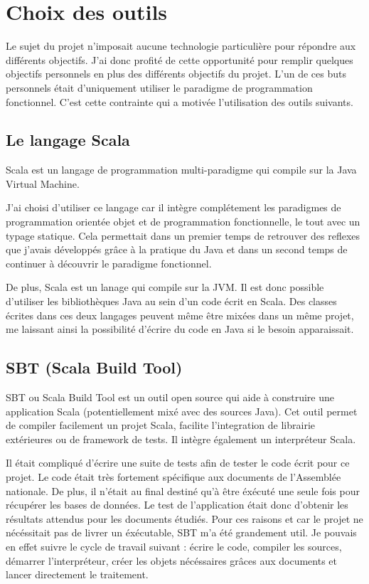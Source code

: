 \section{Choix des outils}

Le sujet du projet n'imposait aucune technologie particulière pour répondre aux différents objectifs. J'ai donc profité de cette opportunité pour remplir quelques objectifs personnels en plus des différents objectifs du projet. L'un de ces buts personnels était d'uniquement utiliser le paradigme de programmation fonctionnel. C'est cette contrainte qui a motivée l'utilisation des outils suivants.

\subsection{Le langage Scala}

Scala est un langage de programmation multi-paradigme qui compile sur la Java Virtual Machine.

J'ai choisi d'utiliser ce langage car il intègre complétement les paradigmes de programmation orientée objet et de programmation fonctionnelle, le tout avec un typage statique. Cela permettait dans un premier temps de retrouver des reflexes que j'avais développés grâce à la pratique du Java et dans un second temps de continuer à découvrir le paradigme fonctionnel.

De plus, Scala est un lanage qui compile sur la JVM. Il est donc possible d'utiliser les bibliothèques Java au sein d'un code écrit en Scala. Des classes écrites dans ces deux langages peuvent même être mixées dans un même projet, me laissant ainsi la possibilité d'écrire du code en Java si le besoin apparaissait.

\subsection{SBT (Scala Build Tool)}

SBT ou Scala Build Tool est un outil open source qui aide à construire une application Scala (potentiellement mixé avec des sources Java). Cet outil permet de compiler facilement un projet Scala, facilite l'integration de librairie extérieures ou de framework de tests. Il intègre également un interpréteur Scala.

Il était compliqué d'écrire une suite de tests afin de tester le code écrit pour ce projet. Le code était très fortement spécifique aux documents de l'Assemblée nationale. De plus, il n'était au final destiné qu'à être éxécuté une seule fois pour récupérer les bases de données. Le test de l'application était donc d'obtenir les résultats attendus pour les documents étudiés.\newline
Pour ces raisons et car le projet ne nécéssitait pas de livrer un éxécutable, SBT m'a été grandement util. Je pouvais en effet suivre le cycle de travail suivant : écrire le code, compiler les sources, démarrer l'interpréteur, créer les objets nécéssaires grâces aux documents et lancer directement le traitement.
